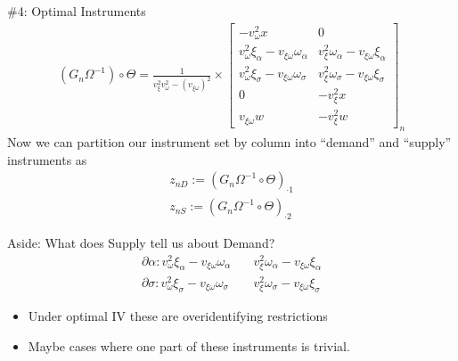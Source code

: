\documentclass[xcolor=pdftex,dvipsnames,table,mathserif,aspectratio=169]{beamer}
\newcommand{\del}{\partial}
\begin{document}
\begin{frame}{\#4: Optimal Instruments}
\begin{align*}
(G_n\Omega^{-1} )\circ \Theta= \frac{1}{v_\xi^2 v_\omega^2 - (v_{\xi \omega})^2}\times \begin{bmatrix}
-v_\omega^2 x & 0 \\
v_\omega^2 \xi_\alpha - v_{\xi \omega}\omega_\alpha & v_\xi^2 \omega_\alpha - v_{\xi \omega}\xi_\alpha \\
v_\omega^2 \xi_\sigma - v_{\xi \omega}\omega_\sigma & v_\xi^2 \omega_\sigma - v_{\xi \omega}\xi_\sigma \\
0 &  -v_\xi^2 x \\
v_{\xi \omega}w & -v_\xi^2 w
\end{bmatrix}_n
\end{align*}
\noindent Now we can partition our instrument set by column into ``demand'' and ``supply'' instruments as 
\begin{align*}
z_{nD} := (G_n\Omega^{-1} \circ \Theta)_{\cdot 1} \\
z_{nS} := (G_n\Omega^{-1} \circ \Theta )_{\cdot 2} 
\end{align*}
\end{frame}

\begin{frame}{Aside: What does Supply tell us about Demand?}
\begin{align*}
\del \alpha: v_\omega^2 \xi_\alpha - v_{\xi \omega}\omega_\alpha  \quad& v_\xi^2 \omega_\alpha - v_{\xi \omega}\xi_\alpha \\
\del \sigma: v_\omega^2 \xi_\sigma - v_{\xi \omega}\omega_\sigma \quad& v_\xi^2 \omega_\sigma - v_{\xi \omega}\xi_\sigma 
\end{align*}
\begin{itemize}
\item Under optimal IV these are \alert{overidentifying restrictions}
\item Maybe cases where one part of these instruments is trivial.
\end{itemize}
\end{frame}
\end{document}
